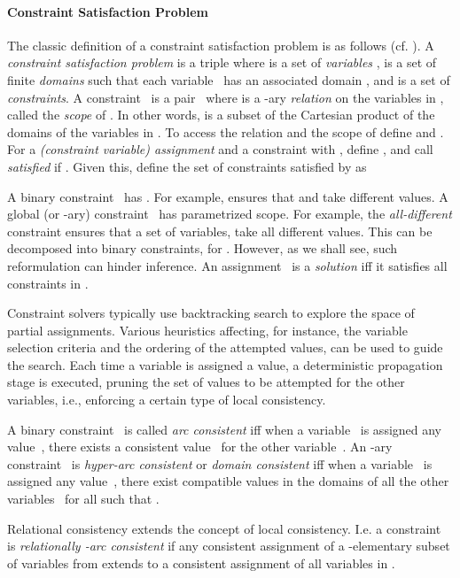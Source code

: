 \documentclass[letterpaper]{article}
\newcommand{\citeay}[1]{\citeauthor{#1} \citeyear{#1}}
\begin{document}
\paragraph{Constraint Satisfaction Problem}
The classic definition of a constraint satisfaction problem is as follows (cf. \citeay{robewa06a}). A \emph{constraint satisfaction problem} is a triple  where  is a set of \emph{variables} ,  is a set of finite \emph{domains}  such that each variable~ has an associated domain , and  is a set of \emph{constraints}. A constraint~ is a pair~ where  is a -ary \emph{relation} on the variables in , called the \emph{scope} of . In other words,  is a subset of the Cartesian product of the domains of the variables in . To access the relation and the scope of  define  and . For a \emph{(constraint variable) assignment}  and a constraint  with , define , and call  \emph{satisfied} if . Given this, define the set of constraints satisfied by  as


A binary constraint~ has . For example,
 ensures that  and  take different
values. A global (or -ary) constraint~ has parametrized
scope. For example, 
the \emph{all-different} constraint ensures that
a set of variables,  take all different values. 
This can be decomposed into  binary
constraints,  for . However, as 
we shall see, such reformulation can hinder inference. 
An assignment~ is a \emph{solution} iff it satisfies all constraints in .

Constraint solvers typically use backtracking search to explore the space of partial assignments. Various heuristics affecting, for instance, the variable selection criteria and the ordering of the attempted values, can be used to guide the search. Each time a variable is assigned a value, a deterministic propagation stage is executed, pruning the set of values to be attempted for the other variables, i.e., enforcing a certain type of local consistency.

A binary constraint~ is called \emph{arc consistent} iff when a variable~ is assigned any value~, there exists a consistent value~ for the other variable~.
An -ary constraint~ is \emph{hyper-arc consistent} or \emph{domain consistent} iff when a variable~ is assigned any value~, there exist compatible values in the domains of all the other variables~ for all  such that .

Relational consistency \cite{debe97a} extends the concept of local consistency. I.e. a constraint~ is \emph{relationally -arc consistent} if any consistent assignment of a -elementary subset of variables from  extends to a consistent assignment of all variables in .
\end{document}
